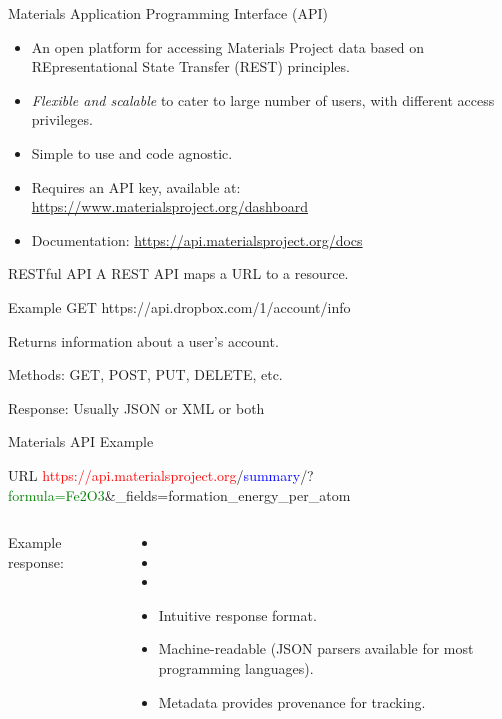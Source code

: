 \documentclass[aspectratio=169]{beamer}
\begin{document}
\begin{frame}{Materials Application Programming Interface (API)\cite{ongMaterialsApplicationProgramming2015}}
\begin{itemize}
    \item An open platform for accessing Materials Project data based on REpresentational State Transfer (REST) principles.
    \item \textit{Flexible and scalable} to cater to large number of users, with different access privileges.
    \item Simple to use and code agnostic.
    \item Requires an API key, available at: \url{https://www.materialsproject.org/dashboard}
    \item Documentation: \url{https://api.materialsproject.org/docs}
\end{itemize}
\end{frame}


\begin{frame}{RESTful API}
A REST API maps a URL to a resource. 
\begin{exampleblock}{Example}
GET https://api.dropbox.com/1/account/info
\end{exampleblock}
Returns information about a user’s account.

Methods: GET, POST, PUT, DELETE, etc.

Response: Usually JSON or XML or both
\end{frame}


\begin{frame}{Materials API Example}
\begin{exampleblock}{URL}
\small
\textcolor{red}{https://api.materialsproject.org}/\textcolor{blue}{summary}/?\textcolor{green}{formula=Fe2O3}\&\_fields=formation\_energy\_per\_atom\\
\end{exampleblock}
\begin{columns}
Example response:
\inputminted{json}{mapi_response.txt}
\begin{itemize}
    \item[]
    \item[]
    \item[]
    \item Intuitive response format.
    \item Machine-readable (JSON parsers available for most programming languages).
    \item Metadata provides provenance for tracking.
\end{itemize}
\end{columns}
\end{frame}
\end{document}
